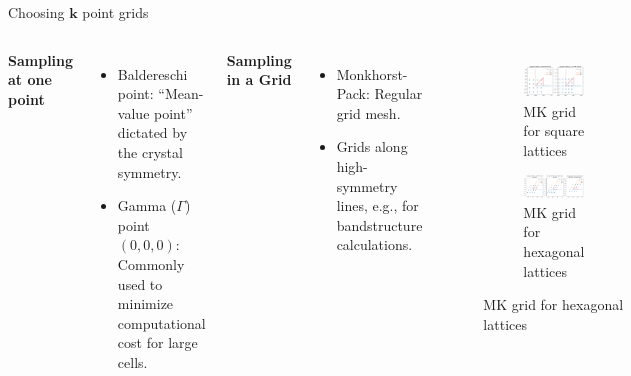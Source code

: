 \documentclass[aspectratio=169]{beamer}
\let \vec \mathbf
\begin{document}
\begin{frame}{Choosing $\vec{k}$ point grids}

\begin{columns}
\textbf{Sampling at one point}
\begin{itemize}
    \item Baldereschi point\cite{baldereschiMeanValuePointBrillouin1973}: ``Mean-value point'' dictated by the crystal symmetry.
    \item Gamma ($\Gamma$) point $(0,0,0)$: Commonly used to minimize computational cost for large cells.
\end{itemize}

\textbf{Sampling in a Grid}
\begin{itemize}
    \item Monkhorst-Pack\cite{monkhorstSpecialPointsBrillouinzone1976}: Regular grid mesh.
    \item Grids along high-symmetry lines, e.g., for bandstructure calculations.
\end{itemize}


\begin{figure}
    \centering
    \begin{subfigure}{\textwidth}
    \centering
        \includegraphics[width=0.55\linewidth]{lectures/figures/7_monkhorst_square.png}
    \caption{MK grid for square lattices}
    \end{subfigure}
    \begin{subfigure}{\textwidth}
        \centering
        \includegraphics[width=0.9\linewidth]{lectures/figures/7_monkhorst_hexagonal.png}
    \caption{MK grid for hexagonal lattices}
    \end{subfigure}
\end{figure} 

\end{columns} 

\end{frame} 
\end{document}
